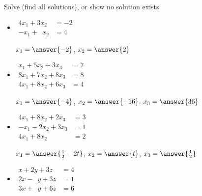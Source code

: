 \documentclass{ximera}
\begin{document}
\begin{exercise}
    Solve (find all solutions), or show no solution exists
    \begin{itemize}
        \item
        $\begin{aligned}
         4x_1+3x_2 & = -2 \\
         -x_1+\phantom{3} x_2 & = 4
        \end{aligned}$
        
        $x_1 = \answer{-2}$, $x_2 = \answer{2}$ 
        \item
        $\begin{aligned}
          x_1+5x_2+3x_3 & = 7 \\
         8x_1+7x_2+8x_3 & = 8 \\
         4x_1+8x_2+6x_3 & = 4
        \end{aligned}$
        
        $x_1 = \answer{-4}$, $x_2 = \answer{-16}$. $x_3 = \answer{36}$
        \item
        $\begin{aligned}
         4x_1+8x_2+2x_3 & = 3 \\
         -x_1-2x_2+3x_3 & = 1 \\
         4x_1+8x_2 \phantom{{}+3x_3} & = 2
        \end{aligned}$
        
        $x_1 = \answer{\frac{1}{2} - 2t}$, $x_2 = \answer{t}$, $x_3 = \answer{\frac{1}{2}}$
        \item
        $\begin{aligned}
          x+2y+3z & = 4 \\
        2  x-\phantom{2} y+3z & = 1 \\
        3  x+\phantom{2} y+6z & = 6
        \end{aligned}$
        \begin{multipleChoice}
        \end{multipleChoice}
    \end{itemize}
\end{exercise}
\end{document}
